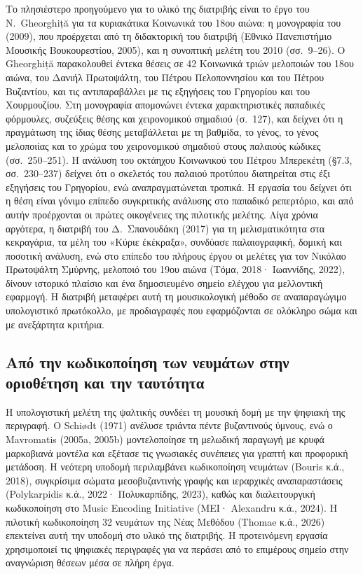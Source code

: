 \documentclass[a4paper]{article}
\begin{document}
Το πλησιέστερο προηγούμενο για το υλικό της διατριβής είναι το έργο του N.~Gheorghiță για τα κυριακάτικα Κοινωνικά του 18ου αιώνα: η μονογραφία του (2009), που προέρχεται από τη διδακτορική του διατριβή (Εθνικό Πανεπιστήμιο Μουσικής Βουκουρεστίου, 2005), και η συνοπτική μελέτη του 2010 (σσ.~9--26). Ο Gheorghiță παρακολουθεί έντεκα θέσεις σε 42 Κοινωνικά τριών μελοποιών του 18ου αιώνα, του Δανιήλ Πρωτοψάλτη, του Πέτρου Πελοποννησίου και του Πέτρου Βυζαντίου, και τις αντιπαραβάλλει με τις εξηγήσεις του Γρηγορίου και του Χουρμουζίου. Στη μονογραφία απομονώνει έντεκα χαρακτηριστικές παπαδικές φόρμουλες, συζεύξεις θέσης και χειρονομικού σημαδιού (σ.~127), και δείχνει ότι η πραγμάτωση της ίδιας θέσης μεταβάλλεται με τη βαθμίδα, το γένος, το γένος μελοποιίας και το χρώμα του χειρονομικού σημαδιού στους παλαιούς κώδικες (σσ.~250--251). Η ανάλυση του οκτάηχου Κοινωνικού του Πέτρου Μπερεκέτη (§7.3, σσ.~230--237) δείχνει ότι ο σκελετός του παλαιού προτύπου διατηρείται στις έξι εξηγήσεις του Γρηγορίου, ενώ αναπραγματώνεται τροπικά. Η εργασία του δείχνει ότι η θέση είναι γόνιμο επίπεδο συγκριτικής ανάλυσης στο παπαδικό ρεπερτόριο, και από αυτήν προέρχονται οι πρώτες οικογένειες της πιλοτικής μελέτης. Λίγα χρόνια αργότερα, η διατριβή του Δ.~Σπανουδάκη (2017) για τη μελισματικότητα στα κεκραγάρια, τα μέλη του «Κύριε ἐκέκραξα», συνδύασε παλαιογραφική, δομική και ποσοτική ανάλυση, ενώ στο επίπεδο του πλήρους έργου οι μελέτες για τον Νικόλαο Πρωτοψάλτη Σμύρνης, μελοποιό του 19ου αιώνα (Τόμα, 2018· Ιωαννίδης, 2022), δίνουν ιστορικό πλαίσιο και ένα δημοσιευμένο σημείο ελέγχου για μελλοντική εφαρμογή. Η διατριβή μεταφέρει αυτή τη μουσικολογική μέθοδο σε αναπαραγώγιμο υπολογιστικό πρωτόκολλο, με προδιαγραφές που εφαρμόζονται σε ολόκληρο σώμα και με ανεξάρτητα κριτήρια.

\subsection{Από την κωδικοποίηση των νευμάτων στην οριοθέτηση και την ταυτότητα}\label{sec:lit-mir}
Η υπολογιστική μελέτη της ψαλτικής συνδέει τη μουσική δομή με την ψηφιακή της περιγραφή. Ο Schiødt (1971) ανέλυσε τριάντα πέντε βυζαντινούς ύμνους, ενώ ο Mavromatis (2005a, 2005b) μοντελοποίησε τη μελωδική παραγωγή με κρυφά μαρκοβιανά μοντέλα και εξέτασε τις γνωσιακές συνέπειες για γραπτή και προφορική μετάδοση. Η νεότερη υποδομή περιλαμβάνει κωδικοποίηση νευμάτων (Bouris κ.ά., 2018), συγκρίσιμα σώματα μεσοβυζαντινής γραφής και ιεραρχικές αναπαραστάσεις (Polykarpidis κ.ά., 2022· Πολυκαρπίδης, 2023), καθώς και διαλειτουργική κωδικοποίηση στο Music Encoding Initiative (MEI· Alexandru κ.ά., 2024). Η πιλοτική κωδικοποίηση 32 νευμάτων της Νέας Μεθόδου (Thomae κ.ά., 2026) επεκτείνει αυτή την υποδομή στο υλικό της διατριβής. Η προτεινόμενη εργασία χρησιμοποιεί τις ψηφιακές περιγραφές για να περάσει από το επιμέρους σημείο στην αναγνώριση θέσεων μέσα σε πλήρη έργα.
\end{document}
